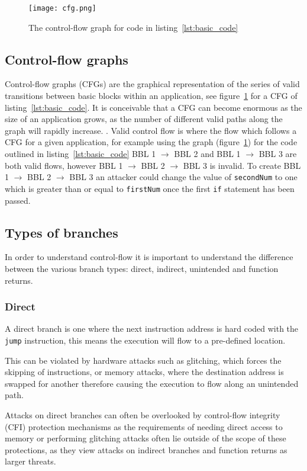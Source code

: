 \begin{figure}
  \texttt{[image: cfg.png]}
  \caption{The control-flow graph for code in listing~\ref{lst:basic_code}}
  \label{fig:basicCFG}
\end{figure}

\subsection{Control-flow graphs}
Control-flow graphs (CFGs) are the graphical representation of the series of valid transitions between basic blocks within an application, see figure~\ref{fig:basicCFG} for a CFG of listing~\ref{lst:basic_code}. It is conceivable that a CFG can become enormous as the size of an application grows, as the number of different valid paths along the graph will rapidly increase.
\ifnotesincluded
{}
\fi. Valid control flow is where the flow which follows a CFG for a given application, for example using the graph (figure~\ref{fig:basicCFG}) for the code outlined in listing~\ref{lst:basic_code} BBL 1 $\rightarrow$ BBL 2 and BBL 1 $\rightarrow$ BBL 3 are both valid flows, however BBL 1 $\rightarrow$ BBL 2 $\rightarrow$ BBL 3 is invalid. To create BBL 1 $\rightarrow$ BBL 2 $\rightarrow$ BBL 3 an attacker could change the value of \verb|secondNum| to one which is greater than or equal to \verb|firstNum| once the first \verb|if| statement has been passed. 

\subsection{Types of branches}
In order to understand control-flow it is important to understand the difference between the various branch types: direct, indirect, unintended and function returns.

\subsubsection{Direct}
A direct branch is one where the next instruction address is hard coded with the \verb|jump| instruction, this means the execution will flow to a pre-defined location.

This can be violated by hardware attacks such as glitching, which forces the skipping of instructions, or memory attacks, where the destination address is swapped for another therefore causing the execution to flow along an unintended path.

Attacks on direct branches can often be overlooked by control-flow integrity (CFI) protection mechanisms as the requirements of needing direct access to memory or performing glitching attacks often lie outside of the scope of these protections, as they view attacks on indirect branches and function returns as larger threats.

